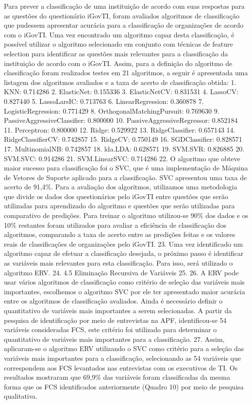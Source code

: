 Para prever a classificação de uma instituição de acordo com suas respostas para as questões do questionário iGovTI, foram avaliados algoritmos de classificação que pudessem apresentar acurácia para a classificação de organizações de acordo com o iGovTI. Uma vez encontrado um algoritmo capaz desta classificação, é possível utilizar o algoritmo selecionado em conjunto com técnicas de feature selection para identificar as questões mais relevantes para a classificação da instituição de acordo com o iGovTI.
Assim, para a definição do algoritmo de classificação foram realizados testes em 21 algoritmos, a seguir é apresentada uma listagem dos algoritmos avaliados e a taxa de acerto de classificação obtida: 
1. KNN: 0.714286
2. ElasticNet: 0.155336
3. ElasticNetCV: 0.831531
4. LassoCV: 0.827440
5. LassoLarsIC: 0.713763
6. LinearRegression: 0.360878
7. LogisticRegression: 0.771429
8. OrthogonalMatchingPursuit: 0.769630
9. PassiveAggressiveClassifier: 0.800000
10. PassiveAggressiveRegressor: 0.852184
11. Perceptron: 0.800000
12. Ridge: 0.529922
13. RidgeClassifier: 0.657143
14. RidgeClassifierCV: 0.742857
15. RidgeCV: 0.750149
16. SGDClassifier: 0.828571
17. MultinomialNB: 0.742857
18. lda.LDA: 0.628571
19. SVM.SVR: 0.826885
20. SVM.SVC: 0.914286
21. SVM.LinearSVC: 0.714286
22. O algoritmo que obteve maior sucesso para classificação foi o SVC, que é uma implementação de Máquina de Vetores de Suporte aplicado para a classificação. SVC apresentou uma taxa de acerto de 91,4\%. Para a avaliação dos algoritmos, utilizamos uma metodologia que divide os dados dos questionários pelo iGovTI entre questões que serão utilizadas para aprendizado do algoritmo e questões que serão utilizadas para comparativo de predições. Para treinar o algoritmo utilizou-se 90\% dos dados e os 10\% restantes foram utilizados para avaliar a eficiência de classificação dos algoritmos, comparando a taxa de acerto entre as predições feitas e os valores reais de classificações de organizações pelo iGovTI. 
23. Uma vez identificado um algoritmo capaz de efetuar a classificação desejada, o próximo passo é identificar as variáveis mais relevantes para esta classificação. Para isso, será utilizado o algoritmo ERV. 
24. 
4.5 Eliminação Recursiva de Variáveis
25. 
26. A ERV pode usar vários algoritmos de classificação como critério de seleção das variáveis mais importantes, escolhemos o algoritmo SVC por ele ter apresentado maior acurácia entre os algoritmos de classificação avaliados. Ainda é necessário definir o quantitativo de variáveis mais importantes a serem selecionadas. A partir da pesquisa de identificação por meio de entrevistas na APF, identificou-se 54 variáveis consideradas FCS, este critério foi utilizado para determinar o quantitativo de variáveis mais importantes para a classificação.
27. Assim, aplicaram-se o algoritmo ERV utilizando o SVC como critério para a seleção das variáveis mais importantes para a classificação, selecionando as 54 variáveis que correspondem aos FCS levantados nas entrevistas com os executivos de TI. Os resultados mostraram que 69,9\% das variáveis foram classificadas da mesma forma que os FCS identificados anteriormente (Quadro 10) por meio de pesquisa qualitativa.